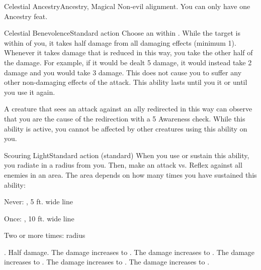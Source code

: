   \begin{magicalfeat}{Celestial Ancestry}{Ancestry, Magical}
    \featpre Non-evil alignment.
     You can only have one Ancestry feat.

    \begin{magicalactiveability}{Celestial Benevolence}{Standard action}
        \rankline
        Choose an  within \shortrange.
        While the target is within \shortrange of you, it takes half damage from all damaging effects (minimum 1).
        Whenever it takes damage that is reduced in this way, you take the other half of the damage.
        For example, if it would be dealt 5 damage, it would instead take 2 damage and you would take 3 damage.
        This does not cause you to suffer any other non-damaging effects of the attack.
        This ability lasts until you  it or until you use it again.

        A creature that sees an attack against an ally redirected in this way can observe that you are the cause of the redirection with a  5 Awareness check.
        While this ability is active, you cannot be affected by other creatures using this ability on you.
    \end{magicalactiveability}

    \begin{magicalsustainability}{Scouring Light}{Standard action}
      \abilitytags {} (standard)
      \rankline
      When you use or sustain this ability, you \briefly radiate  in a \medarea radius from you.
      Then, make an attack vs. Reflex against all enemies in an area.
      The area depends on how many times you have sustained this ability:
      \begin{raggeditemize}
        \item Never: \medarealong, 5 ft. wide line
        \item Once: \medarealong, 10 ft. wide line
        \item Two or more times: \areamed radius
      \end{raggeditemize}
      \hit \damagerankthree.
      \miss Half damage.
      \rankline
       The damage increases to \damagerankfour.
       The damage increases to \damagerankfive.
       The damage increases to \damageranksix.
       The damage increases to \damagerankseven.
       The damage increases to \damagerankeight.
    \end{magicalsustainability}


\end{magicalfeat}
